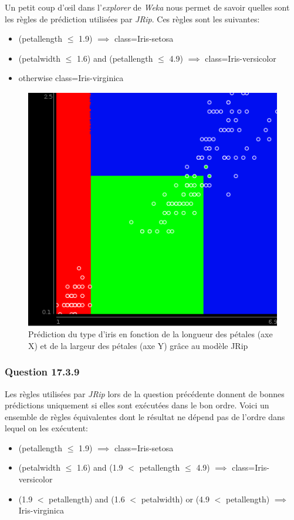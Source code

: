 \documentclass[11pt,a4paper]{article}
\begin{document}
			Un petit coup d'œil dans l'\textit{explorer} de \textit{Weka} nous permet de savoir quelles sont les règles de prédiction utilisées par \textit{JRip}. Ces règles sont les suivantes:
			
			\begin{itemize}
				\item (petallength $\le$ 1.9) $\implies$ class=Iris-setosa
				\item (petalwidth $\le$ 1.6) and (petallength $\le$ 4.9) $\implies$ class=Iris-versicolor
				\item otherwise class=Iris-virginica
			\end{itemize}   
			
			\begin{figure}[h]
				\centering
				\includegraphics[width=.5\textwidth]{iris_JRip}
				\caption{Prédiction du type d'iris en fonction de la longueur des pétales (axe X) et de la largeur des pétales (axe Y) grâce au modèle JRip}
				\label{fig:iris:JRip}
			\end{figure}
			
			\subsubsection*{Question 17.3.9}
			
			Les règles utilisées par \textit{JRip} lors de la question précédente donnent de bonnes prédictions uniquement si elles sont exécutées dans le bon ordre. Voici un ensemble de règles équivalentes dont le résultat ne dépend pas de l'ordre dans lequel on les exécutent:
			
			\begin{itemize}
				\item (petallength $\le$ 1.9) $\implies$ class=Iris-setosa
				\item (petalwidth $\le$ 1.6) and (1.9 $<$ petallength $\le$ 4.9) $\implies$ class=Iris-versicolor
				\item (1.9 $<$ petallength) and (1.6 $<$ petalwidth) or (4.9 $<$ petallength) $\implies$ Iris-virginica
			\end{itemize}
			
\end{document}
